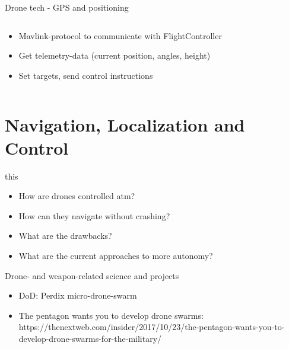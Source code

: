 \documentclass[aspectratio=169]{beamer}
\begin{document}
\begin{frame}{Drone tech - GPS and positioning}
\begin{columns}
	\begin{column}{.74\textwidth}
		\begin{itemize}
			\item Mavlink-protocol to communicate with FlightController
			\item Get telemetry-data (current position, angles, height)
			\item Set targets, send control instructions
		\end{itemize}
	\end{column}
	
	\end{columns}
\end{frame}


\section{Navigation, Localization and Control}

\begin{frame}{this}
	\begin{itemize}
		\item How are drones controlled atm?
		\item How can they navigate without crashing?
		\item What are the drawbacks?
		\item What are the current approaches to more autonomy?
	\end{itemize}
\end{frame}

\begin{frame}{Drone- and weapon-related science and projects}
	\begin{itemize}
		\item DoD: Perdix micro-drone-swarm
        \item The pentagon wants you to develop drone swarms: https://thenextweb.com/insider/2017/10/23/the-pentagon-wants-you-to-develop-drone-swarms-for-the-military/
	\end{itemize}
\end{frame}
\end{document}
